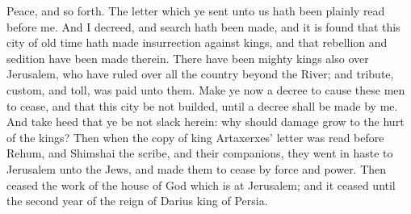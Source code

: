 Peace, and so forth. The letter which ye sent unto us hath been plainly read before me. And I decreed, and search hath been made, and it is found that this city of old time hath made insurrection against kings, and that rebellion and sedition have been made therein. There have been mighty kings also over Jerusalem, who have ruled over all the country beyond the River; and tribute, custom, and toll, was paid unto them. Make ye now a decree to cause these men to cease, and that this city be not builded, until a decree shall be made by me. And take heed that ye be not slack herein: why should damage grow to the hurt of the kings?  Then when the copy of king Artaxerxes’ letter was read before Rehum, and Shimshai the scribe, and their companions, they went in haste to Jerusalem unto the Jews, and made them to cease by force and power. Then ceased the work of the house of God which is at Jerusalem; and it ceased until the second year of the reign of Darius king of Persia. 

